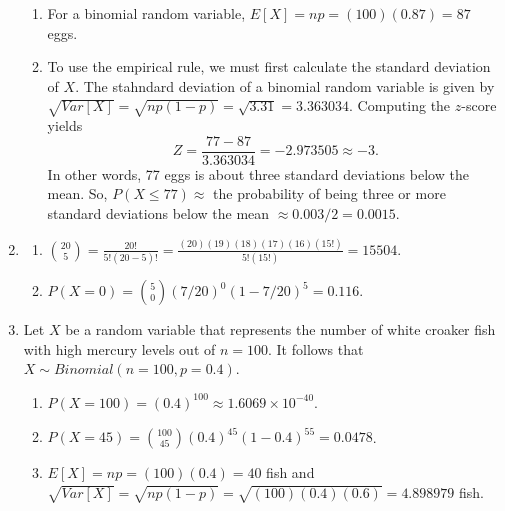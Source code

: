 \documentclass{article}\usepackage[]{graphicx}\usepackage[]{color}
\begin{document}
\begin{enumerate}
\begin{enumerate}
    \item For a binomial random variable, $E\left[X\right] = np = (100)(0.87) = 87$ eggs.
    
    \item To use the empirical rule, we must first calculate the standard deviation of $X$. The stahndard deviation of a binomial random variable is given by $\sqrt{Var\left[X\right]} = \sqrt{np(1-p)} = \sqrt{3.31} = 3.363034$. Computing the $z$-score yields
    \begin{equation*}
      Z = \frac{77 - 87}{3.363034} = -2.973505 \approx -3.
    \end{equation*}
  In other words, 77 eggs is about three standard deviations below the mean. So, $P\left(X \le 77\right) \approx$ the probability of being three or more standard deviations below the mean $\approx 0.003 / 2 = 0.0015$.

  \end{enumerate}

  \item 
  
  \begin{enumerate}
  
    \item $\binom{20}{5} = \frac{20!}{5!(20 - 5)!} = \frac{(20)(19)(18)(17)(16)(15!)}{5!(15!)} = 15504$.
    
    \item $P\left(X = 0\right) = \binom{5}{0}\left(7/20\right)^0(1 - 7/20)^5 = 0.116$.
  
  \end{enumerate}
  
  \item Let $X$ be a random variable that represents the number of white croaker fish with high mercury levels out of $n = 100$. It follows that $X \sim Binomial\left(n = 100, p = 0.4\right)$.
  
  \begin{enumerate}
  
    \item $P\left(X = 100\right) = (0.4)^100 \approx 1.6069 \times 10^{-40}$.
    
    \item $P\left(X = 45\right) = \binom{100}{45}(0.4)^{45}(1 - 0.4)^{55} = 0.0478$.
    
    \item $E\left[X\right] = np = (100)(0.4) = 40$ fish and $\sqrt{Var\left[X\right]} = \sqrt{np(1-p)} = \sqrt{(100)(0.4)(0.6)} = 4.898979$ fish.
    

\end{enumerate}
\end{enumerate}
\end{document}
